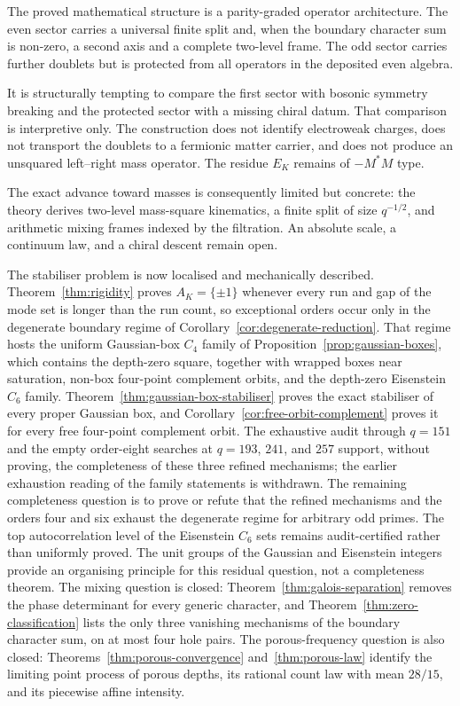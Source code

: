 \documentclass[11pt,a4paper]{article}
\theoremstyle{definition}
\theoremstyle{remark}
\begin{document}
The proved mathematical structure is a parity-graded operator architecture.
The even sector carries a universal finite split and, when the boundary character sum is
non-zero, a second axis and a complete two-level frame.
The odd sector carries further doublets but is protected from all operators in the deposited
even algebra.

It is structurally tempting to compare the first sector with bosonic symmetry breaking and
the protected sector with a missing chiral datum.
That comparison is interpretive only.
The construction does not identify electroweak charges, does not transport the doublets to a
fermionic matter carrier, and does not produce an unsquared left--right mass operator.
The residue $E_K$ remains of $-M^*M$ type.

The exact advance toward masses is consequently limited but concrete: the theory derives
two-level mass-square kinematics, a finite split of size $q^{-1/2}$, and arithmetic mixing
frames indexed by the filtration.
An absolute scale, a continuum law, and a chiral descent remain open.

The stabiliser problem is now localised and mechanically described.
Theorem~\ref{thm:rigidity} proves $A_K=\{\pm1\}$ whenever every run and gap of the mode set
is longer than the run count, so exceptional orders occur only in the degenerate boundary
regime of Corollary~\ref{cor:degenerate-reduction}.
That regime hosts the uniform Gaussian-box $C_4$ family of
Proposition~\ref{prop:gaussian-boxes}, which contains the depth-zero square, together with
wrapped boxes near saturation, non-box four-point complement orbits, and the depth-zero
Eisenstein $C_6$ family.
Theorem~\ref{thm:gaussian-box-stabiliser} proves the exact stabiliser of every proper
Gaussian box, and Corollary~\ref{cor:free-orbit-complement} proves it for every free
four-point complement orbit.
The exhaustive audit through $q=151$ and the empty order-eight searches at
$q=193$, $241$, and $257$ support, without proving, the completeness of these three refined
mechanisms; the earlier exhaustion reading of the family statements is withdrawn.
The remaining completeness question is to prove or refute that the refined mechanisms and
the orders four and six exhaust the degenerate regime for arbitrary odd primes.
The top autocorrelation level of the Eisenstein $C_6$ sets remains audit-certified rather
than uniformly proved.
The unit groups of the Gaussian and Eisenstein integers provide an organising principle
for this residual question, not a completeness theorem.
The mixing question is closed: Theorem~\ref{thm:galois-separation} removes the phase
determinant for every generic character, and Theorem~\ref{thm:zero-classification} lists
the only three vanishing mechanisms of the boundary character sum, on at most four hole
pairs.
The porous-frequency question is also closed: Theorems~\ref{thm:porous-convergence}
and~\ref{thm:porous-law} identify the limiting point process of porous depths, its rational
count law with mean $28/15$, and its piecewise affine intensity.



\end{document}
